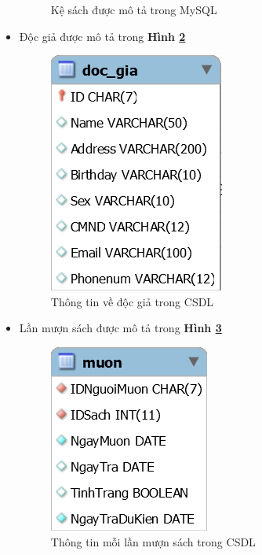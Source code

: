 \documentclass[12pt]{report}
\begin{document}
\begin{itemize}
\begin{figure}[H]
						\caption{Kệ sách được mô tả trong MySQL}
						\label{fig:kesach}
					\end{figure}
					\item{Độc giả được mô tả trong \textbf{Hình \ref{fig:docgia}}}
					\begin{figure}[H]
						\centering
						\includegraphics[scale=1]{images/docgia.png}
						\caption{Thông tin về độc giả trong CSDL}
						\label{fig:docgia}
					\end{figure}
					\item{Lần mượn sách được mô tả trong \textbf{Hình \ref{fig:muon}}}
					\begin{figure}[H]
						\centering
						\includegraphics[scale=1]{images/muon.png}
						\caption{Thông tin mỗi lần mượn sách trong CSDL}
						\label{fig:muon}
					\end{figure}
				\end{itemize}
\end{document}
